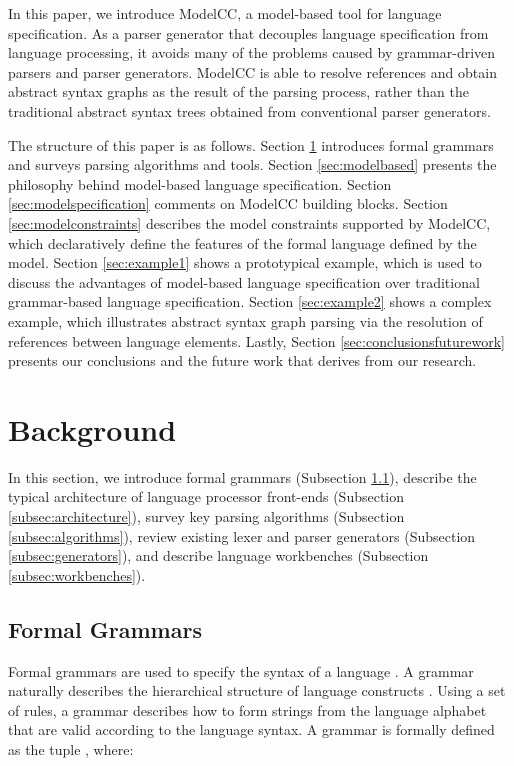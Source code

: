 \documentclass[preprint]{elsarticle}
\begin{document}
In this paper, we introduce ModelCC, a model-based tool for language specification.
As a parser generator that decouples language specification from language processing, it avoids many of the problems caused by grammar-driven parsers and parser generators.
ModelCC is able to resolve references and obtain abstract syntax graphs as the result of the parsing process, rather than the traditional abstract syntax trees obtained from conventional parser generators.

The structure of this paper is as follows.
Section \ref{sec:background} introduces formal grammars and surveys parsing algorithms and tools.
Section \ref{sec:modelbased} presents the philosophy behind model-based language specification.
Section \ref{sec:modelspecification} comments on ModelCC building blocks.
Section \ref{sec:modelconstraints} describes the model constraints supported by ModelCC, which declaratively define the features of the formal language defined by the model.
Section \ref{sec:example1} shows a prototypical example, which is used to discuss the advantages of model-based language specification over traditional grammar-based language specification.
Section \ref{sec:example2} shows a complex example, which illustrates abstract syntax graph parsing via the resolution of references between language elements.
Lastly, Section \ref{sec:conclusionsfuturework} presents our conclusions and the future work that derives from our research.

\section{Background} \label{sec:background}

In this section, we introduce formal grammars (Subsection \ref{subsec:formalgrammars}), describe the typical architecture of language processor front-ends (Subsection \ref{subsec:architecture}), survey key parsing algorithms (Subsection \ref{subsec:algorithms}), review existing lexer and parser generators (Subsection \ref{subsec:generators}), and describe language workbenches (Subsection \ref{subsec:workbenches}).

\subsection{Formal Grammars} \label{subsec:formalgrammars}

Formal grammars are used to specify the syntax of a language \cite{Ginsburg1975,Harrison1978}.
A grammar naturally describes the hierarchical structure of language constructs \cite{Aho2006}.
Using a set of rules, a grammar describes how to form strings from the language alphabet that are valid according to the language syntax.
A grammar  is formally defined \cite{Chomsky1956} as the tuple , where:
\end{document}
